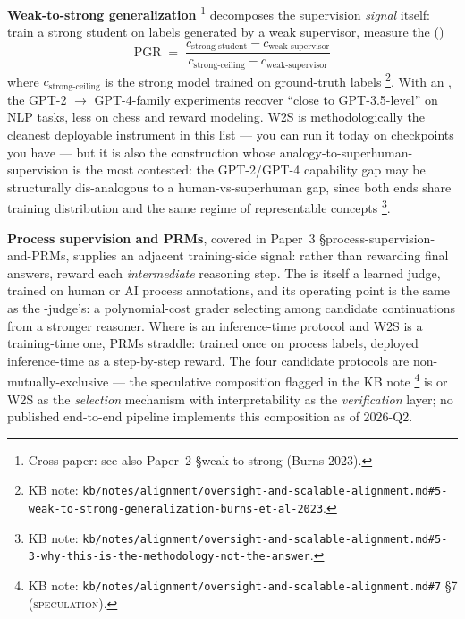 \textbf{Weak-to-strong generalization}
\citep{burns2023-w2s}\footnote{Cross-paper: see also Paper~2
\S{}weak-to-strong (Burns 2023).} decomposes the supervision
\emph{signal} itself: train a strong student on labels generated by a
weak supervisor, measure the  ()
\[
\mathrm{PGR} \;=\; \frac{c_{\text{strong-student}} - c_{\text{weak-supervisor}}}{c_{\text{strong-ceiling}} - c_{\text{weak-supervisor}}}
\]
where $c_{\text{strong-ceiling}}$ is the strong model trained on
ground-truth labels%
\footnote{KB note: \texttt{kb/notes/alignment/oversight-and-scalable-alignment.md\#5-weak-to-strong-generalization-burns-et-al-2023}.}.
With an , the GPT-2 $\to$ GPT-4-family
experiments recover ``close to GPT-3.5-level'' on NLP tasks, less on
chess and reward modeling. W2S is methodologically the cleanest
deployable instrument in this list --- you can run it today on
checkpoints you have --- but it is also the construction whose
analogy-to-superhuman-supervision is the most contested: the
GPT-2/GPT-4 capability gap may be structurally dis-analogous to a
human-vs-superhuman gap, since both ends share training distribution
and the same regime of representable concepts%
\footnote{KB note: \texttt{kb/notes/alignment/oversight-and-scalable-alignment.md\#5-3-why-this-is-the-methodology-not-the-answer}.}.

\textbf{Process supervision and PRMs}, covered in Paper~3
\S{}process-supervision-and-PRMs, supplies an adjacent training-side
signal: rather than rewarding final answers, reward each
\emph{intermediate} reasoning step. The  is itself a learned
judge, trained on human or AI process annotations, and its operating
point is the same as the -judge's: a polynomial-cost grader
selecting among candidate continuations from a stronger reasoner.
Where  is an inference-time protocol and W2S is a training-time
one, PRMs straddle: trained once on process labels, deployed
inference-time as a step-by-step reward. The four candidate protocols
are non-mutually-exclusive --- the speculative composition flagged in
the KB note%
\footnote{KB note: \texttt{kb/notes/alignment/oversight-and-scalable-alignment.md\#7}
\S 7 (\textsc{speculation}).} is  or W2S as the
\emph{selection} mechanism with interpretability as the
\emph{verification} layer; no published end-to-end pipeline
implements this composition as of 2026-Q2.

